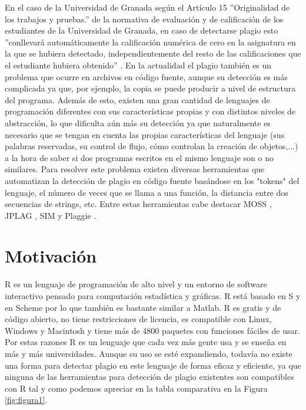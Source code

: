 En el caso de la Universidad de Granada según el Artículo 15 ''Originalidad de los trabajos y pruebas.'' de la normativa de evaluación y de calificación de los estudiantes de la Universidad de Granada, en caso de detectarse plagio esto ''conllevará automáticamente la calificación numérica de cero en la asignatura en la que se hubiera detectado, independientemente del resto de las calificaciones que el estudiante hubiera obtenido'' \cite{normativa_plagio}.
\newline
En la actualidad el plagio también es un problema que ocurre en archivos en código fuente, aunque su detección es más complicada ya que, por ejemplo, la copia se puede producir a nivel de estructura del programa. Además de esto, existen una gran cantidad de lenguajes de programación diferentes con sus características propias y con distintos niveles de abstracción, lo que dificulta aún más su detección ya que naturalmente es necesario que se tengan en cuenta las propias características del lenguaje (sus palabras reservadas, su control de flujo, cómo controlan la creación de objetos,...) a la hora de saber si dos programas escritos en el mismo lenguaje son o no similares.
\newline
Para resolver este problema existen diversas herramientas que automatizan la detección de plagio en código fuente basándose en los "tokens" del lenguaje, el número de veces que se llama a una función, la distancia entre dos secuencias de strings, etc.
\newline
Entre estas herramientas cabe destacar MOSS \cite{Moss_web}, JPLAG \cite{web_jplag}, SIM \cite{sim} y Plaggie \cite{plaggie}.

 
\section{Motivación}

R es un lenguaje de programación de alto nivel y un entorno de software interactivo pensado para computación estadística y gráficas\cite{whatisR}. R está basado en S y en Scheme por lo que también es bastante similar a Matlab.
\newline
R es gratis y de código abierto, no tiene restricciones de licencia, es compatible con Linux, Windows y Macintosh y tiene más de 4800 paquetes con funciones fáciles de usar.
\newline
Por estas razones R es un lenguaje que cada vez más gente usa y se enseña en más y más universidades.
\newline
Aunque su uso se esté expandiendo, todavía no existe una forma para detectar plagio en este lenguaje de forma eficaz y eficiente, ya que ninguna de las herramientas para detección de plagio existentes son compatibles con R tal y como podemos apreciar en la tabla comparativa en la Figura \ref{fig:figura1}. 

